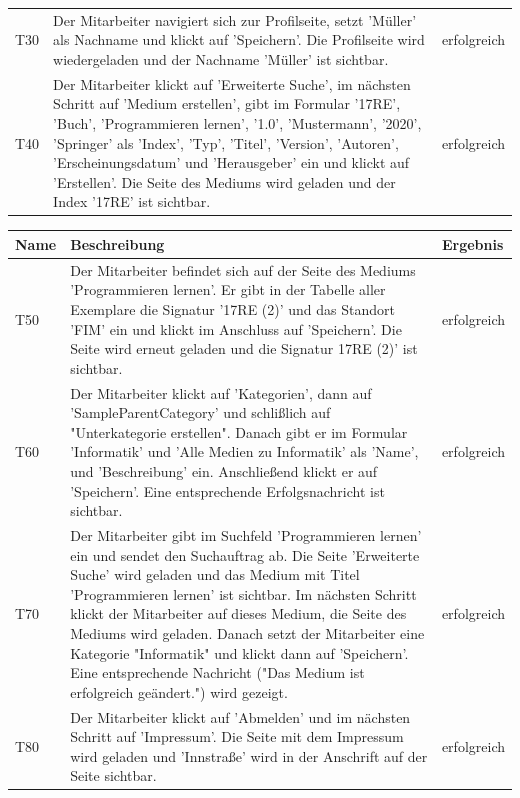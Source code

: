 \documentclass{article}
\begin{document}
\begin{table}[H]
\begin{tabular}{ p{3em} p{32em} p{5em} }
        T30 & Der Mitarbeiter navigiert sich zur Profilseite, setzt ’Müller’ als Nachname und klickt auf ’Speichern’. Die Profilseite wird wiedergeladen und der Nachname ’Müller’ ist sichtbar. & erfolgreich\\
        T40 & Der Mitarbeiter klickt auf ’Erweiterte Suche’, im nächsten Schritt auf ’Medium erstellen’, gibt im Formular ’17RE’, ’Buch’, ’Programmieren lernen’, ’1.0’, ’Mustermann’, ’2020’, ’Springer’ als ’Index’, ’Typ’, ’Titel’, ’Version’, ’Autoren’, ’Erscheinungsdatum’ und ’Herausgeber’ ein und klickt auf ’Erstellen’. Die Seite des Mediums wird geladen und der Index ’17RE’ ist sichtbar. & erfolgreich\\
        \bottomrule
    \end{tabular}
\end{table}
\begin{table}[H]
    \centering
    \begin{tabular}{ p{3em} p{32em} p{5em} }
        \toprule
        \textbf{Name} & \textbf{Beschreibung} & \textbf{Ergebnis}\\
        \midrule
        T50 & Der Mitarbeiter befindet sich auf der Seite des Mediums ’Programmieren lernen’. Er gibt in der Tabelle aller Exemplare die Signatur ’17RE (2)’ und das Standort 'FIM' ein und klickt im Anschluss auf ’Speichern’. Die Seite wird erneut geladen und die Signatur 17RE (2)’ ist sichtbar. & erfolgreich\\
        T60 & Der Mitarbeiter klickt auf ’Kategorien’, dann auf ’SampleParentCategory’ und schlißlich auf "Unterkategorie erstellen". Danach gibt er im Formular ’Informatik’ und ’Alle Medien zu Informatik’ als ’Name’, und ’Beschreibung’ ein. Anschließend klickt er auf ’Speichern’. Eine entsprechende Erfolgsnachricht ist sichtbar. & erfolgreich\\
        T70 & Der Mitarbeiter gibt im Suchfeld ’Programmieren lernen’ ein und sendet den Suchauftrag ab. Die Seite ’Erweiterte Suche’ wird geladen und das Medium mit Titel ’Programmieren lernen’ ist sichtbar. Im nächsten Schritt klickt der Mitarbeiter auf dieses Medium, die Seite des Mediums wird geladen. Danach setzt der Mitarbeiter eine Kategorie "Informatik" und klickt dann auf ’Speichern’. Eine entsprechende Nachricht ("Das Medium ist erfolgreich geändert.") wird gezeigt. & erfolgreich\\
        T80 & Der Mitarbeiter klickt auf ’Abmelden’ und im nächsten Schritt auf ’Impressum’. Die Seite mit dem Impressum wird geladen und ’Innstraße’ wird in der Anschrift auf der Seite sichtbar. & erfolgreich\\

\end{tabular}
\end{table}
\end{document}
